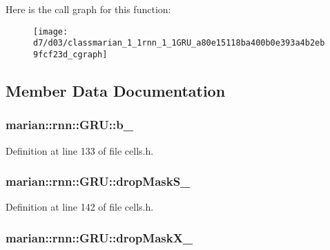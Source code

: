 Here is the call graph for this function\+:
\nopagebreak
\begin{figure}[H]
\begin{center}
\leavevmode
\texttt{[image: d7/d03/classmarian\_1\_1rnn\_1\_1GRU\_a80e15118ba400b0e393a4b2eb9fcf23d\_cgraph]}
\end{center}
\end{figure}




\subsection{Member Data Documentation}
\subsubsection[{\texorpdfstring{b\+\_\+}{b_}}]{ marian\+::rnn\+::\+G\+R\+U\+::b\+\_\+\hspace{0.3cm}{\ttfamily [protected]}}\hypertarget{classmarian_1_1rnn_1_1GRU_a6dc536e4a1f4803a83114a91c26dd8e4}{}\label{classmarian_1_1rnn_1_1GRU_a6dc536e4a1f4803a83114a91c26dd8e4}


Definition at line 133 of file cells.\+h.

\subsubsection[{\texorpdfstring{drop\+Mask\+S\+\_\+}{dropMaskS_}}]{ marian\+::rnn\+::\+G\+R\+U\+::drop\+Mask\+S\+\_\+\hspace{0.3cm}{\ttfamily [protected]}}\hypertarget{classmarian_1_1rnn_1_1GRU_a8ccd8c5d684a9010dca0f38701dcc9fd}{}\label{classmarian_1_1rnn_1_1GRU_a8ccd8c5d684a9010dca0f38701dcc9fd}


Definition at line 142 of file cells.\+h.

\subsubsection[{\texorpdfstring{drop\+Mask\+X\+\_\+}{dropMaskX_}}]{ marian\+::rnn\+::\+G\+R\+U\+::drop\+Mask\+X\+\_\+\hspace{0.3cm}{\ttfamily [protected]}}\hypertarget{classmarian_1_1rnn_1_1GRU_a383afe82e0b8032f88bb27f192b6340c}{}\label{classmarian_1_1rnn_1_1GRU_a383afe82e0b8032f88bb27f192b6340c}


